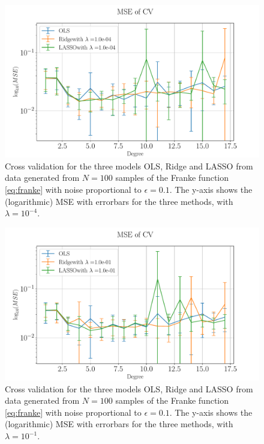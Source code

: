\documentclass[%
reprint,
amsmath,amssymb,
aps,
pra,
]{revtex4-2}
\begin{document}
\begin{figure}[H]
	\centering
	\includegraphics[width=\linewidth]{Python/Figures/CV/CV_2_no_scaling.pdf}
	\caption{Cross validation for the three models OLS, Ridge and LASSO from data generated from \(N=100\) samples of the Franke function \eqref{eq:franke} with noise proportional to \(\epsilon=0.1\). The y-axis shows the (logarithmic) MSE with errorbars for the three methods, with \(\lambda=10^{-4}\). }
	\label{fig:CV_2}
\end{figure}
\begin{figure}[H]
	\centering
	\includegraphics[width=\linewidth]{Python/Figures/CV/CV_3_no_scaling.pdf}
	\caption{Cross validation for the three models OLS, Ridge and LASSO from data generated from \(N=100\) samples of the Franke function \eqref{eq:franke} with noise proportional to \(\epsilon=0.1\). The y-axis shows the (logarithmic) MSE with errorbars for the three methods, with \(\lambda=10^{-1}\). }
	\label{fig:CV_3}
\end{figure}
\end{document}
